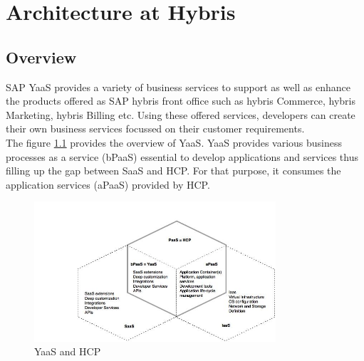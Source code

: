 \chapter{Architecture at Hybris}\label{chapter:hybris_architecture}
\section{Overview}\label{section:hybris_architecture/overview}
SAP \acrshort{YaaS} provides a variety of business services to support as well as enhance the products offered as SAP hybris front office such as hybris Commerce, hybris Marketing, hybris Billing etc. Using these offered services, developers can create their own business services focussed on their customer requirements.\\
The figure \ref{fig:hybris_architecture/overview/yaas_overview} provides the overview of \acrshort{YaaS}. \acrshort{YaaS} provides various business processes as a service (bPaaS) essential to develop applications and services thus filling up the gap between SaaS and HCP. For that purpose, it consumes the application services (aPaaS) provided by \acrshort{HCP}.
\begin{figure}[H]
\begin{center}
\includegraphics[width=0.8\textwidth]{figures/hybris-architecture-one}
\caption{\acrshort{YaaS} and \acrshort{HCP} \cite{Hirsch:2015aa}}
\label{fig:hybris_architecture/overview/yaas_overview}
\end{center}
\end{figure}
\\
